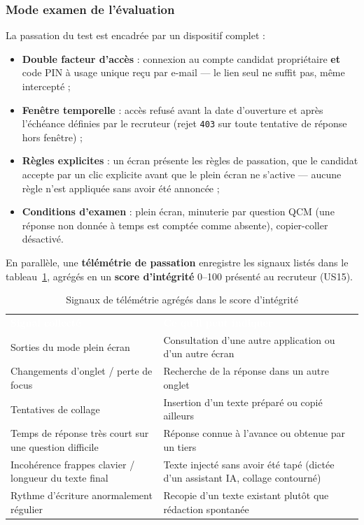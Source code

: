 \documentclass[12pt,a4paper]{report}
\begin{document}
\subsubsection{Mode examen de l'évaluation}

La passation du test est encadrée par un dispositif complet :

\begin{itemize}
  \item \textbf{Double facteur d'accès} : connexion au compte candidat propriétaire \textbf{et} code PIN à usage unique reçu par e-mail --- le lien seul ne suffit pas, même intercepté ;
  \item \textbf{Fenêtre temporelle} : accès refusé avant la date d'ouverture et après l'échéance définies par le recruteur (rejet \texttt{403} sur toute tentative de réponse hors fenêtre) ;
  \item \textbf{Règles explicites} : un écran présente les règles de passation, que le candidat accepte par un clic explicite avant que le plein écran ne s'active --- aucune règle n'est appliquée sans avoir été annoncée ;
  \item \textbf{Conditions d'examen} : plein écran, minuterie par question QCM (une réponse non donnée à temps est comptée comme absente), copier-coller désactivé.
\end{itemize}

En parallèle, une \textbf{télémétrie de passation} enregistre les signaux listés dans le tableau~\ref{tab:signaux-integrite}, agrégés en un \textbf{score d'intégrité} 0--100 présenté au recruteur (US15).

\begin{table}[H]
\centering
\caption{Signaux de télémétrie agrégés dans le score d'intégrité}
\label{tab:signaux-integrite}
\small
\begin{tabularx}{\textwidth}{p{4.5cm} X}
\rowcolor{tabheader}
\textcolor{white}{\textbf{Signal collecté}} & \textcolor{white}{\textbf{Ce qu'il peut indiquer}} \\
Sorties du mode plein écran & Consultation d'une autre application ou d'un autre écran \\
\rowcolor{tabalt}
Changements d'onglet / perte de focus & Recherche de la réponse dans un autre onglet \\
Tentatives de collage & Insertion d'un texte préparé ou copié ailleurs \\
\rowcolor{tabalt}
Temps de réponse très court sur une question difficile & Réponse connue à l'avance ou obtenue par un tiers \\
Incohérence frappes clavier / longueur du texte final & Texte injecté sans avoir été tapé (dictée d'un assistant IA, collage contourné) \\
\rowcolor{tabalt}
Rythme d'écriture anormalement régulier & Recopie d'un texte existant plutôt que rédaction spontanée \\
\bottomrule
\end{tabularx}
\end{table}
\end{document}
